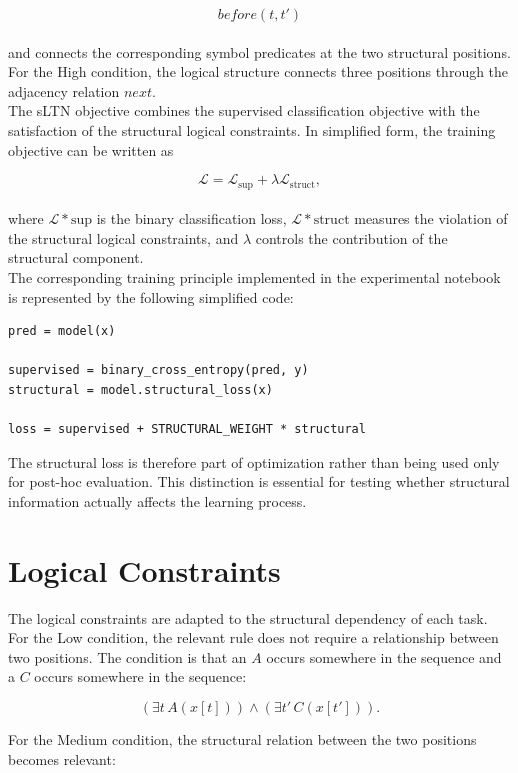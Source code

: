 $$
before(t,t')
$$
\\
and connects the corresponding symbol predicates at the two structural positions.
\\
For the High condition, the logical structure connects three positions through the adjacency relation $next$.
\\
The sLTN objective combines the supervised classification objective with the satisfaction of the structural logical constraints. In simplified form, the training objective can be written as

$$
\mathcal{L}
=
\mathcal{L}_{\mathrm{sup}}
+
\lambda
\mathcal{L}_{\mathrm{struct}},
$$
\\
where $\mathcal{L}*{\mathrm{sup}}$ is the binary classification loss, $\mathcal{L}*{\mathrm{struct}}$ measures the violation of the structural logical constraints, and $\lambda$ controls the contribution of the structural component.
\\
The corresponding training principle implemented in the experimental notebook is represented by the following simplified code:

\begin{verbatim}
pred = model(x)

supervised = binary_cross_entropy(pred, y)
structural = model.structural_loss(x)

loss = supervised + STRUCTURAL_WEIGHT * structural
\end{verbatim}

\noindent
The structural loss is therefore part of optimization rather than being used only for post-hoc evaluation. This distinction is essential for testing whether structural information actually affects the learning process.

\section{Logical Constraints}

\noindent
The logical constraints are adapted to the structural dependency of each task.
\\
For the Low condition, the relevant rule does not require a relationship between two positions. The condition is that an $A$ occurs somewhere in the sequence and a $C$ occurs somewhere in the sequence:

$$
\left(\exists t\, A(x[t])\right)
\land
\left(\exists t'\, C(x[t'])\right).
$$

\noindent
For the Medium condition, the structural relation between the two positions becomes relevant:

